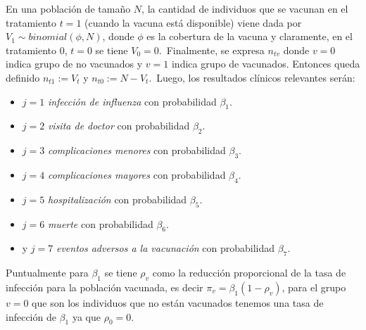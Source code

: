 \documentclass[12pt]{article}
\begin{document}
En una población de tamaño $N$, la cantidad de individuos que se vacunan en el tratamiento $t=1$ (cuando la vacuna está disponible) viene dada por $V_1 \sim binomial(\phi,N)$, donde $\phi$ es la cobertura de la vacuna y claramente, en el tratamiento 0, $t=0$ se tiene $V_0=0$.\
Finalmente, se expresa $n_{tv}$ donde $v=0$ indica grupo de no vacunados y $v=1$ indica grupo de vacunados. Entonces queda definido $n_{t1}:= V_t$ y $n_{t0}:= N-V_t$.\
Luego, los resultados clínicos relevantes serán:
\begin{itemize}
\item $j=1$ \textit{infección de influenza} con probabilidad $\beta_1$.
\item $j=2$ \textit{visita de doctor} con probabilidad $\beta_2$.
\item $j=3$ \textit{complicaciones menores} con probabilidad $\beta_3$.
\item $j=4$ \textit{complicaciones mayores} con probabilidad $\beta_4$.
\item $j=5$ \textit{hospitalización} con probabilidad $\beta_5$.
\item $j=6$ \textit{muerte} con probabilidad $\beta_6$.
\item y $j=7$ \textit{eventos adversos a la vacunación} con probabilidad $\beta_7$.\\
\end{itemize}

Puntualmente para $\beta_1$ se tiene $\rho_v$ como la reducción proporcional de la tasa de infección para la población vacunada, es decir $\pi_{v}=\beta_1(1-\rho_v)$, para el grupo $v=0$ que son los individuos que no están vacunados tenemos una tasa de infección de $\beta_1$ ya que $\rho_0=0$.\\
\end{document}
